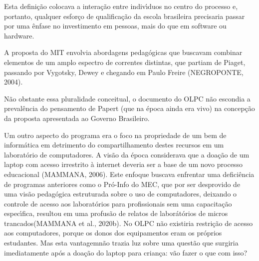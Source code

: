 \documentclass[
12pt,		%
openright,	%
twoside,  %
a4paper,			%
chapter=TITLE,		%
english,			%
french,				%
spanish,			%
brazil				%
]{USPSC-classe/USPSC}
\begin{document}
Esta defini\c{c}\~ao colocava a intera\c{c}\~ao entre indiv\'{\i}duos no centro do processo e, portanto, qualquer esfor\c{c}o de qualifica\c{c}\~ao da escola brasileira precisaria passar por uma \^enfase no investimento em \textquotedbl pessoas, mais do que em software ou hardware\textquotedbl .




A proposta do MIT envolvia abordagens pedag\'ogicas que buscavam combinar elementos de um amplo espectro de correntes distintas, que partiam de Piaget, passando por Vygotsky, Dewey e chegando em Paulo Freire  (NEGROPONTE, 2004).




N\~ao obstante essa pluralidade conceitual, o documento do OLPC n\~ao escondia a preval\^encia do pensamento de Papert (que na \'epoca ainda era vivo) na concep\c{c}\~ao da proposta apresentada ao Governo Brasileiro.





\noindent\begin{center}\mbox{\centering{}}\end{center}


Um outro aspecto do programa era o foco na \textquotedbl propriedade de um bem de inform\'atica em detrimento do compartilhamento destes recursos em um laborat\'orio de computadores\textquotedbl . A vis\~ao da \'epoca considerava que a doa\c{c}\~ao de um laptop com acesso irrestrito \`a internet deveria ser a base de um novo processo educacional  (MAMMANA, 2006). Este enfoque buscava enfrentar uma defici\^encia de programas anteriores como o Pr\'o-Info do MEC, que por ser desprovido de uma vis\~ao pedag\'ogica estruturada sobre o uso de computadores, deixando o controle de acesso aos laborat\'orios para profissionais sem uma capacita\c{c}\~ao espec\'{\i}fica, resultou em uma profus\~ao de relatos de \textquotedbl labor\'at\'orios de micros trancados\textquotedbl   (MAMMANA et al., 2020b). No OLPC n\~ao existiria restri\c{c}\~ao de acesso aos computadores, porque os donos dos equipamentos eram os pr\'oprios estudantes. Mas esta \textquotedbl vantagem\textquotedbl  n\~ao trazia luz sobre  uma quest\~ao que surgiria imediatamente ap\'os a doa\c{c}\~ao do laptop para crian\c{c}a: v\~ao fazer o que com isso?
\end{document}
